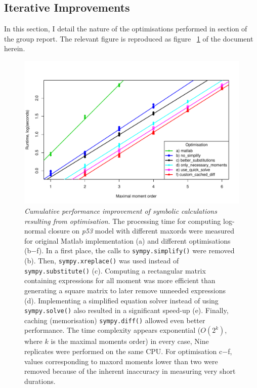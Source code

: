 \documentclass[11pt,a4paper]{article}
\newcommand{\pft}{\textit{p53}}
\newcommand{\citationneeded}[2][]{\todo[color=brown, fancyline, #1]{\textbf{Citation Needed:} #2}}
\begin{document}
 
\subsection{Iterative Improvements}
In this section, I detail the nature of the optimisations performed in section\citationneeded{} of the group report.
The relevant figure is reproduced as figure ~\ref{fig:mea_speed} of the document herein.

\begin{figure}[tbh]
\includegraphics[width=0.95\textwidth{}]{mea_speed.pdf}
\caption{\emph{Cumulative performance improvement of symbolic 
calculations resulting from optimisation}.
The processing time for computing log-normal closure on \pft{} model with different \gls{maxord}s were measured for original Matlab implementation (a) and different optimisations (b$-$f).
In a first place, the calls to \texttt{sympy.simplify()} were removed (b). 
Then, \texttt{sympy.xreplace()} was used instead of \texttt{sympy.substitute()} (c). 
Computing a rectangular matrix containing expressions for all moment was more efficient than generating a square matrix to later remove unneeded expressions (d).
Implementing a simplified equation solver instead of using \texttt{sympy.solve()} also resulted in a significant speed-up (e). 
Finally, caching (memorisation) \texttt{sympy.diff()} allowed even better performance.
The time complexity appears exponential ($O(2^k)$, where $k$ is the maximal moments order) in every case, 
Nine replicates were performed on the same CPU. 
For optimisation c$-$f, values corresponding to \gls{maxord} moments lower than two were removed because of
the inherent inaccuracy in measuring very short durations.}
\label{fig:mea_speed}
\end{figure}
\end{document}
